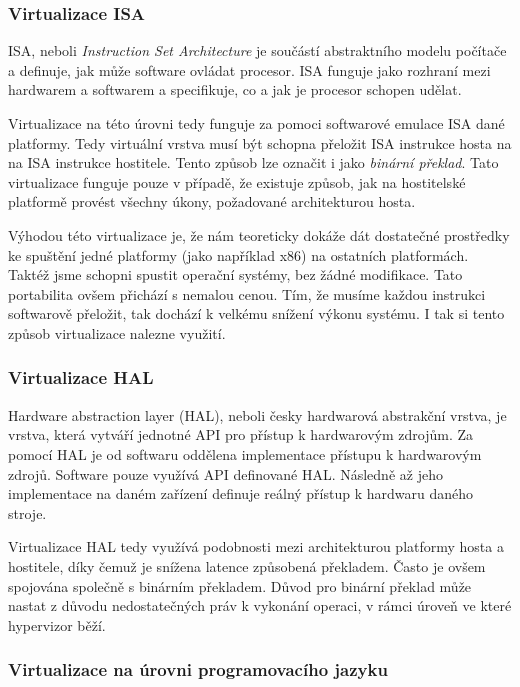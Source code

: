 \subsubsection{Virtualizace ISA}

ISA, neboli \textit{Instruction Set Architecture} je součástí abstraktního modelu počítače a definuje, jak může software ovládat procesor. ISA funguje jako rozhraní mezi hardwarem a softwarem a specifikuje, co a jak je procesor schopen udělat.\,\cite{isa-arm}

Virtualizace na této úrovni tedy funguje za pomoci softwarové emulace ISA dané platformy. Tedy virtuální vrstva musí být schopna přeložit ISA instrukce hosta na na ISA instrukce hostitele. Tento způsob lze označit i jako \textit{binární překlad}. Tato virtualizace funguje pouze v případě, že existuje způsob, jak na hostitelské platformě provést všechny úkony, požadované architekturou hosta. 

Výhodou této virtualizace je, že nám teoreticky dokáže dát dostatečné prostředky ke spuštění jedné platformy (jako například x86) na ostatních platformách. Taktéž jsme schopni spustit operační systémy, bez žádné modifikace. Tato portabilita ovšem přichází s nemalou cenou. Tím, že musíme každou instrukci softwarově přeložit, tak dochází k velkému snížení výkonu systému. I tak si tento způsob virtualizace nalezne využití. \cite{chiueh2005survey}\cite{RODRIGUEZHARO2012267}


\subsubsection{Virtualizace HAL}

Hardware abstraction layer (HAL), neboli česky hardwarová abstrakční vrstva, je vrstva, která vytváří jednotné API pro přístup k hardwarovým zdrojům. Za pomocí HAL je od softwaru oddělena implementace přístupu k hardwarovým zdrojů. Software pouze využívá API definované HAL. Následně až jeho implementace na daném zařízení definuje reálný přístup k hardwaru daného stroje. \cite{haldef}

Virtualizace HAL tedy využívá podobnosti mezi architekturou platformy hosta a hostitele, díky čemuž je snížena latence způsobená překladem. Často je ovšem spojována společně s binárním překladem. Důvod pro binární překlad může nastat z důvodu nedostatečných práv k vykonání operaci, v rámci úroveň ve které hypervizor běží. \cite{chiueh2005survey}\cite{vcc_2}


\subsubsection{Virtualizace na úrovni programovacího jazyku}

